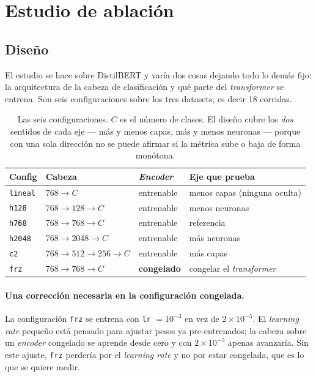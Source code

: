 \section{Estudio de ablación}
\label{sec:ablation}

\subsection{Diseño}

El estudio se hace sobre DistilBERT y varía dos cosas dejando todo lo demás
fijo: la arquitectura de la cabeza de clasificación y qué parte del
\textit{transformer} se entrena. Son seis configuraciones sobre los tres
datasets, es decir \num{18} corridas.

\begin{table}[h]
\centering
\small
\begin{tabular}{llll}
\toprule
\textbf{Config} & \textbf{Cabeza} & \textbf{\textit{Encoder}} & \textbf{Eje que prueba} \\
\midrule
\texttt{lineal} & $768 \to C$                & entrenable  & menos capas (ninguna oculta) \\
\texttt{h128}   & $768 \to 128 \to C$        & entrenable  & menos neuronas \\
\texttt{h768}   & $768 \to 768 \to C$        & entrenable  & referencia \\
\texttt{h2048}  & $768 \to 2048 \to C$       & entrenable  & más neuronas \\
\texttt{c2}     & $768 \to 512 \to 256 \to C$& entrenable  & más capas \\
\texttt{frz}    & $768 \to 768 \to C$        & \textbf{congelado} & congelar el \textit{transformer} \\
\bottomrule
\end{tabular}
\caption{Las seis configuraciones. $C$ es el número de clases. El diseño cubre
los \emph{dos} sentidos de cada eje --- más y menos capas, más y menos
neuronas --- porque con una sola dirección no se puede afirmar si la métrica
sube o baja de forma monótona.}
\end{table}

\paragraph{Una corrección necesaria en la configuración congelada.} La
configuración \texttt{frz} se entrena con \texttt{lr} $=10^{-3}$ en vez de
$2\times10^{-5}$. El \textit{learning rate} pequeño está pensado para ajustar
pesos ya pre-entrenados; la cabeza sobre un \textit{encoder} congelado se
aprende desde cero y con $2\times10^{-5}$ apenas avanzaría. Sin este ajuste,
\texttt{frz} perdería por el \textit{learning rate} y no por estar congelada,
que es lo que se quiere medir.

